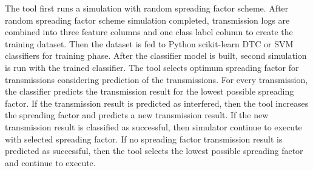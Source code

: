 The tool first runs a simulation with random spreading factor scheme. After random spreading factor scheme simulation completed, transmission logs are combined into three feature columns and one class label column to create the training dataset. Then the dataset is fed to Python scikit-learn DTC or SVM classifiers for training phase. After the classifier model is built, second simulation is run with the trained classifier. The tool selects optimum spreading factor for transmissions considering prediction of the transmissions. For every transmission, the classifier predicts the transmission result for the lowest possible spreading factor. If the transmission result is predicted as interfered, then the tool increases the spreading factor and predicts a new transmission result. If the new transmission result is classified as successful, then simulator continue to execute with selected spreading factor. If no spreading factor transmission result is predicted as successful, then the tool selects the lowest possible spreading factor and continue to execute.
